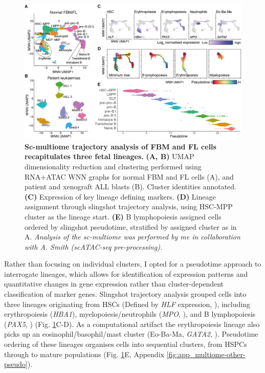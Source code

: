 \begin{figure}[!t]
    \centering
    \includegraphics[width=\textwidth,height=\textheight,keepaspectratio]{figures/chapter4/ch4_multiome-clusters.png}
    \caption[{Sc-multiome trajectory analysis of  FBM and FL cells recapitulates three fetal lineages.}]
    {\textbf{Sc-multiome trajectory analysis of  FBM and FL cells recapitulates three fetal lineages.} 
    \textbf{(A, B)} UMAP dimensionality reduction and clustering performed using RNA+ATAC WNN graphs for normal FBM and FL cells (A), and patient and xenograft ALL blasts (B). Cluster identities annotated.
    \textbf{(C)} Expression of key lineage defining markers.
    \textbf{(D)} Lineage assignment through slingshot trajectory analysis, using HSC-MPP cluster as the lineage start.
    \textbf{(E)} B lymphopoiesis assigned cells ordered by slingshot pseudotime, stratified by assigned cluster as in A. 
    \textit{Analysis of the sc-multiome was performed by me in collaboration with A. Smith (scATAC-seq pre-processing).}
    }
    \label{fig:ch4_multiome-clusters}
\end{figure}

Rather than focusing on individual clusters, I opted for a pseudotime approach to interrogate lineages, which allows for identification of expression patterns and quantitative changes in gene expression rather than cluster-dependent classification of marker genes. Slingshot trajectory analysis grouped cells into three lineages originating from HSCs (Defined by \textit{HLF} expression, \cite{lehnertz_hlf_2021}), including erythropoiesis (\textit{HBA1}), myelopoiesis/neutrophils (\textit{MPO}, \cite{aratani_myeloperoxidase_2018}), and B lymphopoiesis (\textit{PAX5}, \cite{nutt_pax5_2001}) (Fig. \ref{fig:ch4_multiome-clusters}C-D). As a computational artifact the erythropoiesis lineage also picks up an eosinophil/basophil/mast cluster (Eo-Ba-Ma, \textit{GATA2}, \cite{ohmori_gata2_2015}). Pseudotime ordering of these lineages organises cells into sequential clusters, from HSPCs through to mature populations (Fig. \ref{fig:ch4_multiome-clusters}E, Appendix \ref{fig:app_multiome-other-pseudo}).

